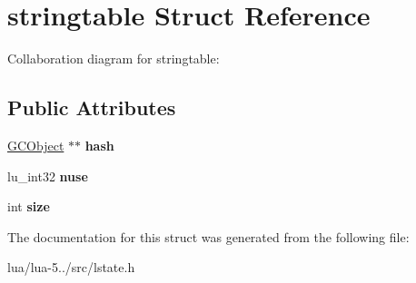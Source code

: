\hypertarget{structstringtable}{\section{stringtable Struct Reference}
\label{structstringtable}
}


Collaboration diagram for stringtable\+:
\subsection*{Public Attributes}
\begin{DoxyCompactItemize}
\item 
\hypertarget{structstringtable_a132ba77978bbf9852ad840e11975e347}{\hyperlink{union_g_c_object}{G\+C\+Object} $\ast$$\ast$ {\bfseries hash}}\label{structstringtable_a132ba77978bbf9852ad840e11975e347}

\item 
\hypertarget{structstringtable_ad7c9469851e685d30693fe5866faf305}{lu\+\_\+int32 {\bfseries nuse}}\label{structstringtable_ad7c9469851e685d30693fe5866faf305}

\item 
\hypertarget{structstringtable_a10674affaad79ff819b6aa3b4618b94e}{int {\bfseries size}}\label{structstringtable_a10674affaad79ff819b6aa3b4618b94e}

\end{DoxyCompactItemize}


The documentation for this struct was generated from the following file\+:\begin{DoxyCompactItemize}
\item 
lua/lua-\/5../src/lstate.\+h\end{DoxyCompactItemize}
